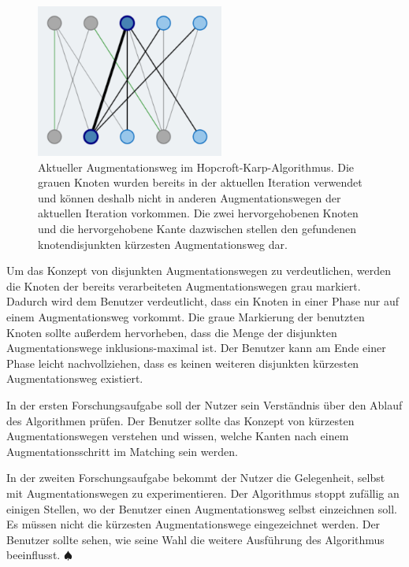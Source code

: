 \begin{figure}[h!]
	\centering
	\includegraphics[width=0.55\textwidth]{figures/hopcroft_karp_augmentation}
	\caption[Hopcroft-Karp: Augmentationsweg]{Aktueller Augmentationsweg im Hopcroft-Karp-Algorithmus. Die grauen Knoten wurden bereits in der aktuellen Iteration verwendet und können deshalb nicht in anderen Augmentationswegen der aktuellen Iteration vorkommen. Die zwei hervorgehobenen Knoten und die hervorgehobene Kante dazwischen stellen den gefundenen knotendisjunkten kürzesten Augmentationsweg dar.}\label{fig:hopcroft_karp_augmentation}
\end{figure}

Um das Konzept von disjunkten Augmentationswegen zu verdeutlichen, werden die Knoten der bereits verarbeiteten Augmentationswegen grau markiert. Dadurch wird dem Benutzer verdeutlicht, dass ein Knoten in einer Phase nur auf einem Augmentationsweg vorkommt. 
Die graue Markierung der benutzten Knoten sollte außerdem hervorheben, dass die Menge der disjunkten Augmentationswege inklusions-maximal ist. Der Benutzer kann am Ende einer Phase leicht nachvollziehen, dass es keinen weiteren disjunkten kürzesten Augmentationsweg existiert.

In der ersten Forschungsaufgabe soll der Nutzer sein Verständnis über den Ablauf des Algorithmen prüfen. Der Benutzer sollte das Konzept von kürzesten Augmentationswegen verstehen und wissen, welche Kanten nach einem Augmentationsschritt im Matching sein werden.

In der zweiten Forschungsaufgabe bekommt der Nutzer die Gelegenheit, selbst mit Augmentationswegen zu experimentieren. Der Algorithmus stoppt zufällig an einigen Stellen, wo der Benutzer einen Augmentationsweg selbst einzeichnen soll. Es müssen nicht die kürzesten Augmentationswege eingezeichnet werden. Der Benutzer sollte sehen, wie seine Wahl die weitere Ausführung des Algorithmus beeinflusst. \hfill$\spadesuit$

